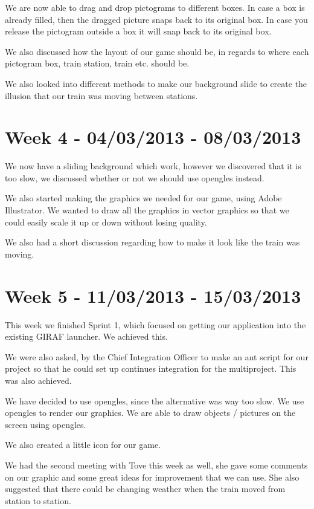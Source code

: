 We are now able to drag and drop pictograms to different boxes. In case a box is already filled, then the dragged picture snaps back to its original box. In case you release the pictogram outside a box it will snap back to its original box. 

We also discussed how the layout of our game should be, in regards to where each pictogram box, train station, train etc. should be. 

We also looked into different methods to make our background slide to create the illusion that our train was moving between stations. 

\section*{Week 4 - 04/03/2013 - 08/03/2013}
We now have a sliding background which work, however we discovered that it is too slow, we discussed whether or not we should use \ac{opengles} instead. 

We also started making the graphics we needed for our game, using Adobe Illustrator. We wanted to draw all the graphics in vector graphics so that we could easily scale it up or down without losing quality. 

We also had a short discussion regarding how to make it look like the train was moving.

\section*{Week 5 - 11/03/2013 - 15/03/2013}
This week we finished Sprint 1, which focused on getting our application into the existing GIRAF launcher. We achieved this. 

We were also asked, by the Chief Integration Officer to make an ant script for our project so that he could set up continues integration for the multiproject. This was also achieved. 

We have decided to use \ac{opengles}, since the alternative was way too slow. We use \ac{opengles} to render our graphics. We are able to draw objects / pictures on the screen using \ac{opengles}. 

We also created a little icon for our game. 

We had the second meeting with Tove this week as well, she gave some comments on our graphic and some great ideas for improvement that we can use. She also suggested that there could be changing weather when the train moved from station to station. 

